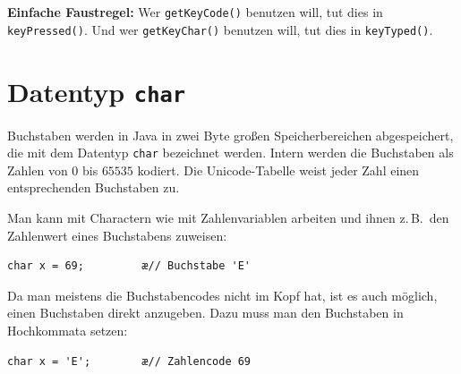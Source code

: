 \textbf{Einfache Faustregel:} Wer \lstinline|getKeyCode()| benutzen will, tut dies in
\lstinline|keyPressed()|. Und wer \lstinline|getKeyChar()| benutzen will, tut
dies in \lstinline|keyTyped()|.


\section{Datentyp \texttt{char}}

Buchstaben werden in Java in zwei Byte großen Speicherbereichen abgespeichert,
die mit dem Datentyp \lstinline|char| bezeichnet werden. Intern werden die
Buchstaben als Zahlen von $0$ bis $65535$ kodiert. Die Unicode-Tabelle weist
jeder Zahl einen entsprechenden Buchstaben zu.

Man kann mit Charactern wie mit Zahlenvariablen arbeiten und ihnen z.\,B.\ den
Zahlenwert eines Buchstabens zuweisen:

\begin{lstlisting}
char x = 69;         æ// Buchstabe 'E'
\end{lstlisting}

Da man meistens die Buchstabencodes nicht im Kopf hat, ist es auch möglich,
einen Buchstaben direkt anzugeben. Dazu muss man den Buchstaben in Hochkommata
setzen:

\begin{lstlisting}
char x = 'E';        æ// Zahlencode 69
\end{lstlisting}
